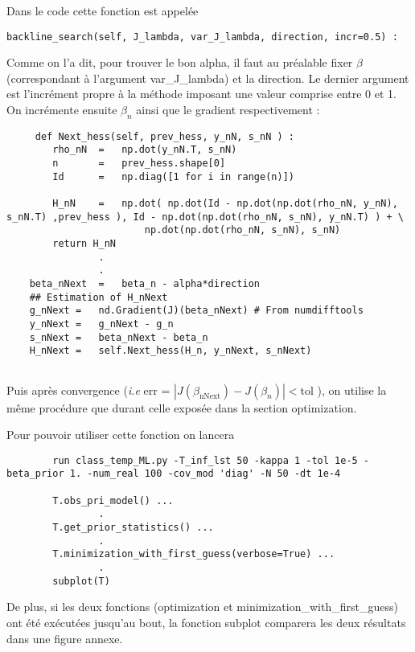 \documentclass[a4paper,12pt]{article}
\numberwithin{equation}{section} %
\begin{document}
\noindent Dans le code cette fonction est appelée 
\begin{lstlisting}
backline_search(self, J_lambda, var_J_lambda, direction, incr=0.5) : 
\end{lstlisting}

Comme on l'a dit, pour trouver le bon alpha, il faut au préalable fixer $\beta$ (correspondant à l'argument var\_J\_lambda) et la direction. Le dernier argument est l'incrément propre à la méthode imposant une valeur comprise entre 0 et 1.\\
 
 \noindent On incrémente ensuite $\beta_n$ ainsi que le gradient respectivement :
 \begin{lstlisting}
     def Next_hess(self, prev_hess, y_nN, s_nN ) :
        rho_nN  =   np.dot(y_nN.T, s_nN)
        n       =   prev_hess.shape[0]
        Id      =   np.diag([1 for i in range(n)])
        
        H_nN    =   np.dot( np.dot(Id - np.dot(np.dot(rho_nN, y_nN), s_nN.T) ,prev_hess ), Id - np.dot(np.dot(rho_nN, s_nN), y_nN.T) ) + \
                        np.dot(np.dot(rho_nN, s_nN), s_nN)
        return H_nN
        		.
        		.        
	beta_nNext  =   beta_n - alpha*direction       
    ## Estimation of H_nNext
    g_nNext =   nd.Gradient(J)(beta_nNext) # From numdifftools
    y_nNext =   g_nNext - g_n
    s_nNext =   beta_nNext - beta_n
    H_nNext =   self.Next_hess(H_n, y_nNext, s_nNext)
			
\end{lstlisting}

\noindent Puis après convergence (\textit{i.e} err = $\left| J\left(\beta_{\text{nNext}}\right) - J\left(\beta_n\right) \right| < \text{tol }$), on utilise la même procédure que durant celle exposée dans la section optimization.

Pour pouvoir utiliser cette fonction on lancera 
\begin{lstlisting}
		run class_temp_ML.py -T_inf_lst 50 -kappa 1 -tol 1e-5 -beta_prior 1. -num_real 100 -cov_mod 'diag' -N 50 -dt 1e-4
	
		T.obs_pri_model() ...
				.
	    T.get_prior_statistics() ...
	    		.
	    T.minimization_with_first_guess(verbose=True) ...
				.
		subplot(T)    
\end{lstlisting}
\noindent De plus, si les deux fonctions (optimization et minimization\_with\_first\_guess) ont été exécutées jusqu'au bout, la fonction subplot comparera les deux résultats dans une figure annexe.
\end{document}
